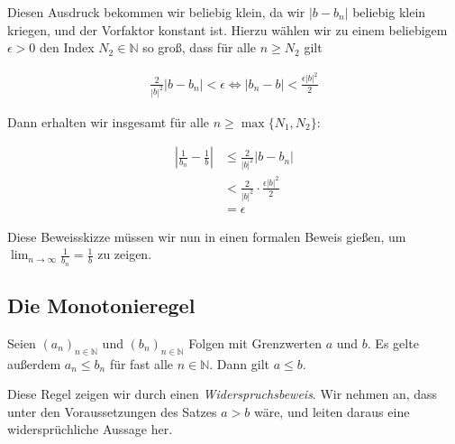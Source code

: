 \documentclass[fontsize=9pt,
               parskip=half-,
               DIV=14,
               listof=chapterentry,
               tocflat]{scrbook}
\begin{document}
\begin{solutionprocess*}
Diesen Ausdruck bekommen wir beliebig klein, da wir $|b-b_{n}|$ beliebig klein kriegen, und der Vorfaktor konstant ist. Hierzu wählen wir zu einem beliebigem $\epsilon >0$ den Index $N_{2}\in \mathbb {N} $ so groß, dass für alle $n\geq N_{2}$ gilt

\begin{align*}
{\frac {2}{|b|^{2}}}|b-b_{n}|<\epsilon \iff |b_{n}-b|<{\frac {\epsilon |b|^{2}}{2}}
\end{align*}

Dann erhalten wir insgesamt für alle $n\geq \max\{N_{1},N_{2}\}$:

\begin{align*}
\left|{\frac {1}{b_{n}}}-{\frac {1}{b}}\right|&\leq {\frac {2}{|b|^{2}}}|b-b_{n}|\\[0.5em]&<{\frac {2}{|b|^{2}}}\cdot {\frac {\epsilon |b|^{2}}{2}}\\[0.5em]&=\epsilon 
\end{align*}

Diese Beweisskizze müssen wir nun in einen formalen Beweis gießen, um $\lim _{n\to \infty }{\tfrac {1}{b_{n}}}={\tfrac {1}{b}}$ zu zeigen.

\end{solutionprocess*}

\subsection{Die Monotonieregel}

\begin{theorem*}
Seien $(a_{n})_{n\in \mathbb {N} }$ und $(b_{n})_{n\in \mathbb {N} }$ Folgen mit Grenzwerten $a$ und $b$. Es gelte außerdem $a_{n}\leq b_{n}$ für fast alle $n\in \mathbb {N} $. Dann gilt $a\leq b$.

\end{theorem*}

\begin{proofsummary*}
Diese Regel zeigen wir durch einen \emph{Widerspruchsbeweis}. Wir nehmen an, dass unter den Voraussetzungen des Satzes $a>b$ wäre, und leiten daraus eine widersprüchliche Aussage her.

\end{proofsummary*}
\end{document}
